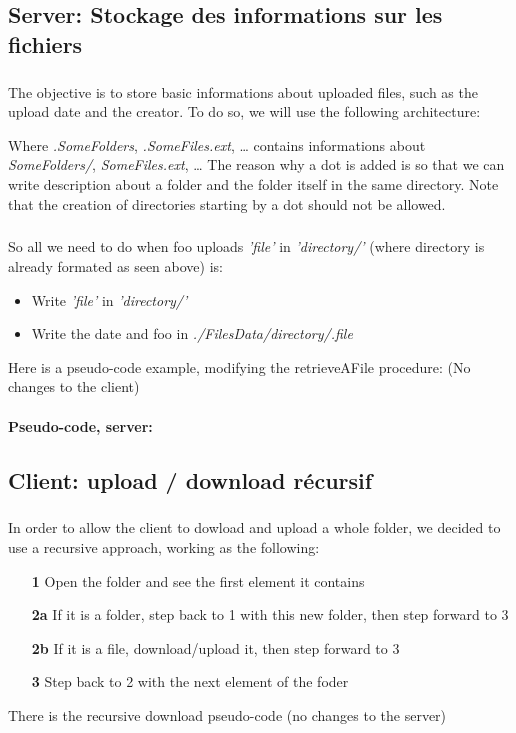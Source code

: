 \documentclass[12pt,a4paper,twoside]{article}
\begin{document}
		\subsection{Server: Stockage des informations sur les fichiers} %
			\subparagraph*{}
				The objective is to store basic informations about uploaded files, such as the upload date and the creator.
				To do so, we will use the following architecture:
				\begin{samepage}
					
				\end{samepage}
				Where \textit{.SomeFolders}, \textit{.SomeFiles.ext}, \ldots{} contains informations about \textit{SomeFolders/}, \textit{SomeFiles.ext}, \ldots{}
				The reason why a dot is added is so that we can write description about a folder and the folder itself in the same directory. Note that the creation of directories starting by a dot should not be allowed.
			\subparagraph*{}
				So all we need to do when foo uploads \textit{'file'} in \textit{'directory/'} (where directory is already formated as seen above) is:
				\begin{itemize}
					\item{} Write \textit{'file'} in \textit{'directory/'}
					\item{} Write the date and foo in \textit{./FilesData/directory/.file}
				\end{itemize}
				Here is a pseudo-code example, modifying the retrieveAFile procedure: (No changes to the client)
			\paragraph*{Pseudo-code, server:}
				
				
		\subsection{Client: upload / download récursif} %
			\subparagraph*{}
				In order to allow the client to dowload and upload a whole folder, we decided to use a recursive approach, working as the following:
				\begin{itemize}
					\item[\textbf{1 }]{} Open the folder and see the first element it contains
					\item[\textbf{2a}]{} If it is a folder, step back to 1 with this new folder, then step forward to 3
					\item[\textbf{2b}]{} If it is a file, download/upload it, then step forward to 3
					\item[\textbf{3 }]{} Step back to 2 with the next element of the foder
				\end{itemize}
				There is the recursive download pseudo-code (no changes to the server)
\end{document}
